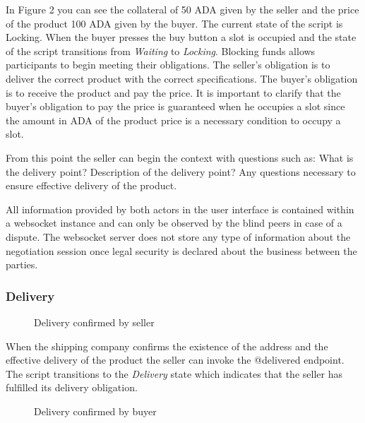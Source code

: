 \documentclass[12pt]{article}
\begin{document}
In Figure 2 you can see the collateral of 50 ADA given by the seller and the price of the product 100 ADA given by the buyer. The current state of the script is Locking. 
When the buyer presses the buy button a slot is occupied and the state of the script transitions from \emph{Waiting} to \emph{Locking}.
Blocking funds allows participants to begin meeting their obligations.
The seller's obligation is to deliver the correct product with the correct specifications. The buyer's obligation is to receive the product and pay the price.
It is important to clarify that the buyer's obligation to pay the price is guaranteed when he occupies a slot since the amount in ADA of the product price is a necessary condition to occupy a slot.

From this point the seller can begin the context with questions such as: What is the delivery point? Description of the delivery point? Any questions necessary to ensure effective delivery of the product.

All information provided by both actors in the user interface is contained within a websocket instance and can only be observed by the blind peers in case of a dispute.
The websocket server does not store any type of information about the negotiation session once legal security is declared about the business between the parties.



\subsubsection { Delivery }


\begin{figure}[ht]
  \centering
  
  \caption{Delivery confirmed by seller}  
  \label{fig:delivered}
\end{figure}


When the shipping company confirms the existence of the address and the effective delivery of the product the seller can invoke the @delivered endpoint.
The script transitions to the \emph{Delivery} state which indicates that the seller has fulfilled its delivery obligation.

\begin{figure}[ht]
  \centering
  
  \caption{Delivery confirmed by buyer}
  \label{fig:delivered}
\end{figure}
\end{document}
